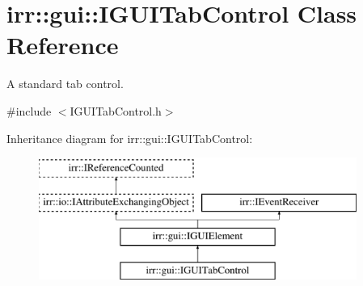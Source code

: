 \hypertarget{classirr_1_1gui_1_1IGUITabControl}{}\section{irr\+:\+:gui\+:\+:I\+G\+U\+I\+Tab\+Control Class Reference}
\label{classirr_1_1gui_1_1IGUITabControl}


A standard tab control.  




{\ttfamily \#include $<$I\+G\+U\+I\+Tab\+Control.\+h$>$}

Inheritance diagram for irr\+:\+:gui\+:\+:I\+G\+U\+I\+Tab\+Control\+:\begin{figure}[H]
\begin{center}
\leavevmode
\includegraphics[height=4.000000cm]{classirr_1_1gui_1_1IGUITabControl}
\end{center}
\end{figure}
